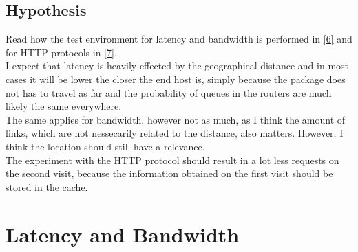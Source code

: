 \documentclass{acm_proc_article-sp}
\begin{document}
\subsection{Hypothesis}
Read how the test  environment for latency and bandwidth is performed in \ref{6} and for HTTP protocols in \ref{7}.\\
I expect that latency is heavily effected by the geographical distance and in most cases it will be lower the closer the end host is, simply because the package does not has to travel as far and the probability of queues in the routers are much likely the same everywhere.\\
The same applies for bandwidth, however not as much, as I think the amount of links, which are not nessecarily related to the distance, also matters. However, I think the location should still have a relevance.\\
The experiment with the HTTP protocol should result in a lot less requests on the second visit, because the information obtained on the first visit should be stored in the cache.
 

\section{Latency and Bandwidth}
\end{document}
